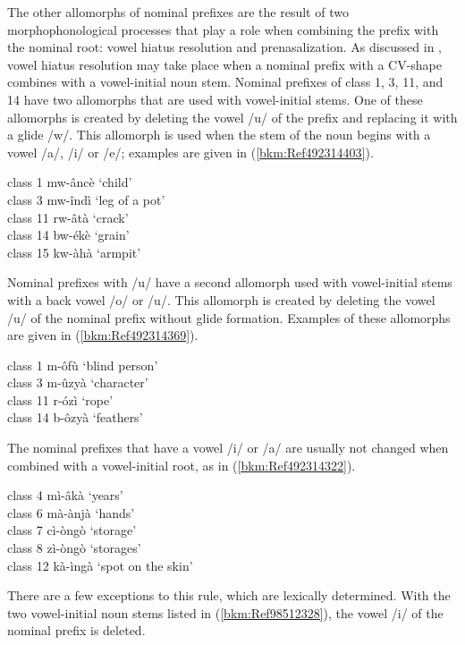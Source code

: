 The other allomorphs of nominal prefixes are the result of two morphophonological processes that play a role when combining the prefix with the nominal root: vowel hiatus resolution and prenasalization. As discussed in , vowel hiatus resolution may take place when a nominal prefix with a CV-shape combines with a vowel-initial noun stem. Nominal prefixes of class 1, 3, 11, and 14 have two allomorphs that are used with vowel-initial stems. One of these allomorphs is created by deleting the vowel /u/ of the prefix and replacing it with a glide /w/. This allomorph is used when the stem of the noun begins with a vowel /a/, /i/ or /e/; examples are given in (\ref{bkm:Ref492314403}).

\ea
\label{bkm:Ref492314403}
\ea
class 1    mw-âncè    ‘child’\\
\ex
class 3    mw-îndì    ‘leg of a pot’\\
\ex
class 11  rw-âtà      ‘crack’\\
\ex
class 14  bw-ékè    ‘grain’\\
\ex
class 15  kw-àhà    ‘armpit’
\z\z

Nominal prefixes with /u/ have a second allomorph used with vowel-initial stems with a back vowel /o/ or /u/. This allomorph is created by deleting the vowel /u/ of the nominal prefix without glide formation. Examples of these allomorphs are given in (\ref{bkm:Ref492314369}).

\ea
\label{bkm:Ref492314369}
\ea 
class 1    m-ôfù      ‘blind person’\\
\ex class 3    m-ûzyà    ‘character’\\
\ex class 11  r-ózì      ‘rope’\\
\ex class 14  b-ôzyà    ‘feathers’
\z\z

The nominal prefixes that have a vowel /i/ or /a/ are usually not changed when combined with a vowel-initial root, as in (\ref{bkm:Ref492314322}).

\ea
\label{bkm:Ref492314322}
\ea
class 4    mì-âkà    ‘years’\\
\ex class 6    mà-ànjà    ‘hands’\\
\ex class 7    cì-òngò    ‘storage’\\
\ex class 8    zì-òngò    ‘storages’\\
\ex class 12  kà-ìngà    ‘spot on the skin’
\z\z

There are a few exceptions to this rule, which are lexically determined. With the two vowel-initial noun stems listed in (\ref{bkm:Ref98512328}), the vowel /i/ of the nominal prefix is deleted.

